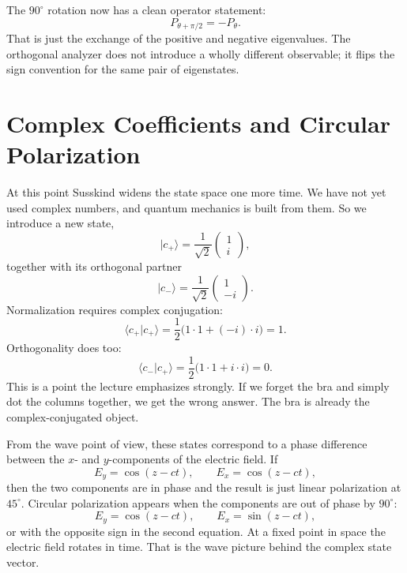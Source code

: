 The \(90^\circ\) rotation now has a clean operator statement:
\begin{equation}
P_{\theta+\pi/2}=-P_\theta.
\end{equation}
That is just the exchange of the positive and negative eigenvalues. The orthogonal analyzer does not introduce a wholly different observable; it flips the sign convention for the same pair of eigenstates.

\section{Complex Coefficients and Circular Polarization}

At this point Susskind widens the state space one more time. We have not yet used complex numbers, and quantum mechanics is built from them. So we introduce a new state,
\begin{equation}
|c_+\rangle=\frac{1}{\sqrt2}
\begin{pmatrix}
1\\
i
\end{pmatrix},
\end{equation}
together with its orthogonal partner
\begin{equation}
|c_-\rangle=\frac{1}{\sqrt2}
\begin{pmatrix}
1\\
-i
\end{pmatrix}.
\end{equation}
Normalization requires complex conjugation:
\begin{equation}
\langle c_+|c_+\rangle
=
\frac12\bigl(1\cdot 1+(-i)\cdot i\bigr)=1.
\end{equation}
Orthogonality does too:
\begin{equation}
\langle c_-|c_+\rangle
=
\frac12\bigl(1\cdot 1+i\cdot i\bigr)=0.
\end{equation}
This is a point the lecture emphasizes strongly. If we forget the bra and simply dot the columns together, we get the wrong answer. The bra is already the complex-conjugated object.

From the wave point of view, these states correspond to a phase difference between the \(x\)- and \(y\)-components of the electric field. If
\begin{equation}
E_y=\cos(z-ct),
\qquad
E_x=\cos(z-ct),
\end{equation}
then the two components are in phase and the result is just linear polarization at \(45^\circ\). Circular polarization appears when the components are out of phase by \(90^\circ\):
\begin{equation}
E_y=\cos(z-ct),
\qquad
E_x=\sin(z-ct),
\end{equation}
or with the opposite sign in the second equation. At a fixed point in space the electric field rotates in time. That is the wave picture behind the complex state vector.

